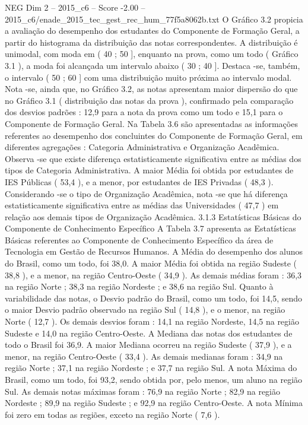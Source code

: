 \begin{textsample}{NEG Dim 2 – 2015\_c6 – Score -2.00 – 2015\_c6/enade\_2015\_tec\_gest\_rec\_hum\_77f5a8062b.txt}
O Gráfico 3.2 propicia a avaliação do desempenho dos estudantes do Componente de Formação Geral, a partir do histograma da distribuição das notas correspondentes.
A distribuição é unimodal, com moda em ( 40 ; 50 ], enquanto na prova, como um todo ( Gráfico 3.1 ), a moda foi alcançada um intervalo abaixo ( 30 ; 40 ].
Destaca -se, também, o intervalo ( 50 ; 60 ] com uma distribuição muito próxima ao intervalo modal.
Nota -se, ainda que, no Gráfico 3.2, as notas apresentam maior dispersão do que no Gráfico 3.1 ( distribuição das notas da prova ), confirmado pela comparação dos desvios padrões : 12,9 para a nota da prova como um todo e 15,1 para o Componente de Formação Geral.
Na Tabela 3.6 são apresentadas as informações referentes ao desempenho dos concluintes do Componente de Formação Geral, em diferentes agregações : Categoria Administrativa e Organização Acadêmica.
Observa -se que existe diferença estatisticamente significativa entre as médias dos tipos de Categoria Administrativa.
A maior Média foi obtida por estudantes de IES Públicas ( 53,4 ), e a menor, por estudantes de IES Privadas ( 48,3 ).
Considerando -se o tipo de Organização Acadêmica, nota -se que há diferença estatisticamente significativa entre as médias das Universidades ( 47,7 ) em relação aos demais tipos de Organização Acadêmica. 3.1.3 Estatísticas Básicas do Componente de Conhecimento Específico A Tabela 3.7 apresenta as Estatísticas Básicas referentes ao Componente de Conhecimento Específico da área de Tecnologia em Gestão de Recursos Humanos.
A Média do desempenho dos alunos do Brasil, como um todo, foi 38,0.
A maior Média foi obtida na região Sudeste ( 38,8 ), e a menor, na região Centro-Oeste ( 34,9 ).
As demais médias foram : 36,3 na região Norte ; 38,3 na região Nordeste ; e 38,6 na região Sul.
Quanto à variabilidade das notas, o Desvio padrão do Brasil, como um todo, foi 14,5, sendo o maior Desvio padrão observado na região Sul ( 14,8 ), e o menor, na região Norte ( 12,7 ).
Os demais desvios foram : 14,1 na região Nordeste, 14,5 na região Sudeste e 14,0 na região Centro-Oeste.
A Mediana das notas dos estudantes de todo o Brasil foi 36,9.
A maior Mediana ocorreu na região Sudeste ( 37,9 ), e a menor, na região Centro-Oeste ( 33,4 ).
As demais medianas foram : 34,9 na região Norte ; 37,1 na região Nordeste ; e 37,7 na região Sul.
A nota Máxima do Brasil, como um todo, foi 93,2, sendo obtida por, pelo menos, um aluno na região Sul.
As demais notas máximas foram : 76,9 na região Norte ; 82,9 na região Nordeste ; 89,9 na região Sudeste ; e 92,9 na região Centro-Oeste.
A nota Mínima foi zero em todas as regiões, exceto na região Norte ( 7,6 ).

\end{textsample}
